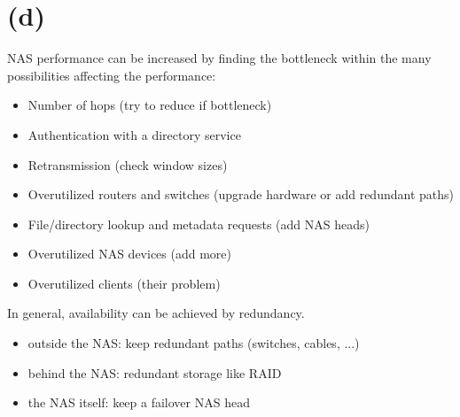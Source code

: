 \documentclass{article}
\begin{document}
\section*{(d)}
NAS performance can be increased by finding the bottleneck within the many possibilities affecting the performance:
\begin{itemize}
\item Number of hops (try to reduce if bottleneck)
\item Authentication with a directory service
\item Retransmission (check window sizes)
\item Overutilized routers and switches (upgrade hardware or add redundant paths)
\item File/directory lookup and metadata requests (add NAS heads)
\item Overutilized NAS devices (add more)
\item Overutilized clients (their problem)
\end{itemize}
In general, availability can be achieved by redundancy.
\begin{itemize}
\item outside the NAS: keep redundant paths (switches, cables, ...)
\item behind the NAS: redundant storage like RAID
\item the NAS itself: keep a failover NAS head
\end{itemize}
\end{document}
